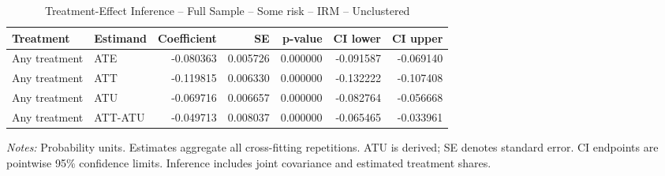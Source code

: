 \begin{table}[htbp]
\centering
\caption{Treatment-Effect Inference -- Full Sample -- Some risk -- IRM -- Unclustered}
\label{tab:inference-SomeRiskHome-IRM-iid}
\scriptsize
\begin{adjustbox}{max width=\linewidth}
\begin{tabular}{llrrrrr}
\toprule
Treatment & Estimand & Coefficient & SE & p-value & CI lower & CI upper \\
\midrule
Any treatment & ATE & -0.080363 & 0.005726 & 0.000000 & -0.091587 & -0.069140 \\
Any treatment & ATT & -0.119815 & 0.006330 & 0.000000 & -0.132222 & -0.107408 \\
Any treatment & ATU & -0.069716 & 0.006657 & 0.000000 & -0.082764 & -0.056668 \\
Any treatment & ATT-ATU & -0.049713 & 0.008037 & 0.000000 & -0.065465 & -0.033961 \\
\bottomrule
\end{tabular}

\end{adjustbox}
\par\smallskip
\begin{minipage}{\linewidth}\scriptsize \textit{Notes:} Probability units. Estimates aggregate all cross-fitting repetitions. ATU is derived; SE denotes standard error. CI endpoints are pointwise 95\% confidence limits. Inference includes joint covariance and estimated treatment shares. \end{minipage}
\end{table}

